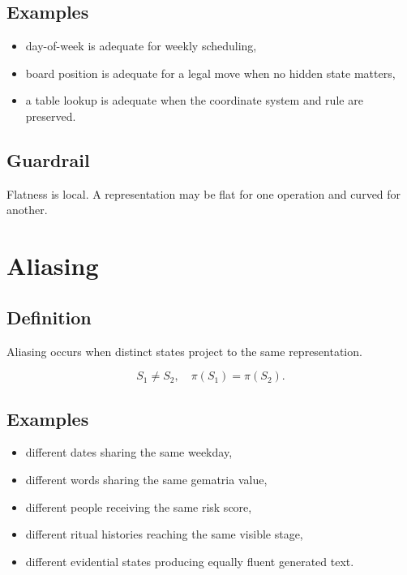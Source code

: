 \documentclass[11pt]{book}
\begin{document}
\subsection*{Examples}

\begin{itemize}
    \item day-of-week is adequate for weekly scheduling,
    \item board position is adequate for a legal move when no hidden state matters,
    \item a table lookup is adequate when the coordinate system and rule are preserved.
\end{itemize}

\subsection*{Guardrail}

Flatness is local. A representation may be flat for one operation and curved for another.

\section{Aliasing}

\subsection*{Definition}

Aliasing occurs when distinct states project to the same representation.

\[
S_1 \neq S_2,
\quad
\pi(S_1)=\pi(S_2).
\]

\subsection*{Examples}

\begin{itemize}
    \item different dates sharing the same weekday,
    \item different words sharing the same gematria value,
    \item different people receiving the same risk score,
    \item different ritual histories reaching the same visible stage,
    \item different evidential states producing equally fluent generated text.
\end{itemize}
\end{document}
